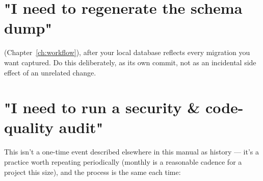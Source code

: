 \section{"I need to regenerate the schema dump"}
 (Chapter~\ref{ch:workflow}), after your local database reflects every migration you want captured. Do this deliberately, as its own commit, not as an incidental side effect of an unrelated change.

\section{"I need to run a security \& code-quality audit"}
This isn't a one-time event described elsewhere in this manual as history — it's a practice worth repeating periodically (monthly is a reasonable cadence for a project this size), and the process is the same each time:

